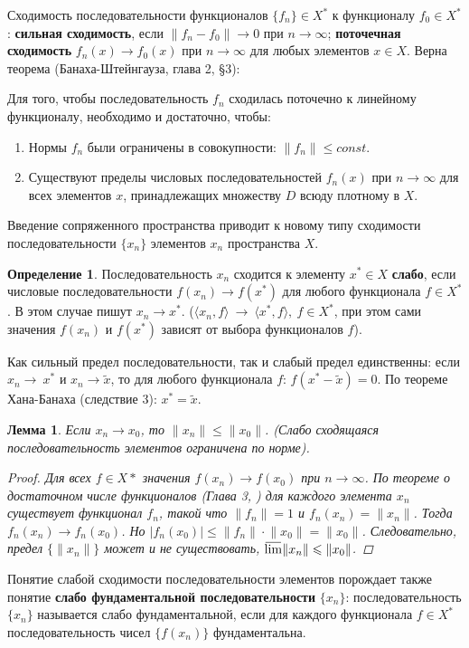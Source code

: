 \documentclass[12pt,a4paper,titlepage,oneside]{book}
\newcommand{\overbar}[1]{\mkern 1.5mu\overline{\mkern-1.5mu#1\mkern-1.5mu}\mkern 1.5mu}
\theoremstyle{definition}
\newtheorem*{definition}{Определение}
\theoremstyle{plain}
\theoremstyle{remark}
\theoremstyle{remark}
\theoremstyle{remark}
\theoremstyle{remark}
\theoremstyle{plain}
\newtheorem*{lemma}{Лемма}
\theoremstyle{plain}
\begin{document}
Сходимость последовательности функционалов $\{f_n\}\in X^*$ к функционалу $f_0\in X^*$: \textbf{сильная сходимость}, если $\lVert f_n - f_0\rVert \to 0$ при $n\to\infty$; \textbf{поточечная сходимость} $f_n(x)\to f_0(x)$ при $n\to\infty$ для любых элементов $x\in X$. Верна теорема (Банаха-Штейнгауза, глава 2, \S 3):

Для того, чтобы последовательность $f_n$ сходилась поточечно к линейному функционалу, необходимо и достаточно, чтобы:

\begin{enumerate}
\item Нормы $f_n$ были ограничены в совокупности: $\lVert f_n\rVert \leqslant const$.
\item Существуют пределы числовых последовательностей $f_n(x)$ при $n\to\infty$ для всех элементов $x$, принадлежащих множеству $D$
    всюду плотному в $X$.
\end{enumerate}

Введение сопряженного пространства приводит к новому типу сходимости последовательности $\{x_n\}$ элементов $x_n$ пространства $X$.

\begin{definition}
Последовательность $x_n$ сходится к элементу $x^* \in X$ \textbf{слабо}, если числовые последовательности $f(x_n) \rightarrow f(x^*)$ для любого функционала $f \in X^*$. В этом случае пишут $x_n \rightarrow x^*$. ($ \langle x_n,f \rangle  \ \rightarrow \  \langle x^*, f \rangle ,\ f \in X^*$, при этом сами значения $f(x_n)$ и $f(x^*)$ зависят от выбора функционалов $f$).

Как сильный предел последовательности, так и слабый предел единственны: если $x_n\rightarrow~x^*$ и $x_n \rightarrow \widetilde{x}$, то для любого функционала $f$: $f(x^*-\widetilde{x})=0$. По теореме Хана-Банаха (следствие 3): $x^*=\widetilde{x}$.
\end{definition}

\begin{lemma}
Если $x_n \rightarrow x_0$, то $\lVert x_n \rVert \leqslant \lVert x_0 \rVert$. (Слабо сходящаяся последовательность элементов ограничена по норме).
\begin{proof}
Для всех $f \in X*$ значения $f(x_n) \rightarrow f(x_0)$ при $n \rightarrow \infty$. По теореме о достаточном числе функционалов (Глава 3, ) для каждого элемента $x_n$ существует функционал $f_n$, такой что $\lVert f_n \rVert =1$ и $f_n(x_n)=\lVert x_n \rVert$. Тогда $f_n(x_n) \rightarrow f_n(x_0)$. Но $|f_n(x_0)| \leqslant \lVert f_n \rVert \cdot \lVert x_0 \rVert = \lVert x_0 \rVert$. Следовательно, предел $\{ \lVert x_n \rVert \}$ может и не существовать, $\overbar{\lim}\lVert x_n \rVert \leqslant \lVert x_0 \rVert$.
\end{proof}
\end{lemma}
Понятие слабой сходимости последовательности элементов порождает также понятие \textbf{слабо фундаментальной последовательности} $\{x_n\}$: последовательность $\{x_n\}$ называется слабо фундаментальной, если для каждого функционала $f \in X^*$ последовательность чисел $\{f(x_n)\}$ фундаментальна.
\end{document}
